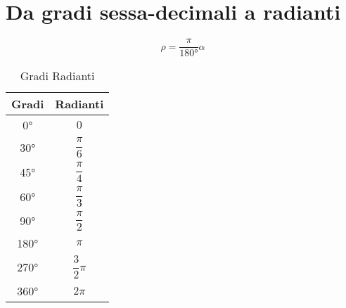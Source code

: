 \section{Da gradi sessa-decimali a radianti}
\begin{equation*}
\rho=\dfrac{\pi}{\ang{180}}\alpha
\end{equation*}
\begin{table}
	\centering
		\begin{tabular}{cc}
		\toprule 
		Gradi	&Radianti \\ 
		\midrule
		\ang{0}	&$0$  \\ 
		\ang{30}	&$\dfrac{\pi}{6}$  \\[0.3cm] 
		\ang{45}	&$\dfrac{\pi}{4}$  \\[0.3cm]  
		\ang{60}	&$\dfrac{\pi}{3}$  \\[0.3cm]  
		\ang{90}	&$\dfrac{\pi}{2}$  \\[0.3cm]  
		\ang{180}	&$\pi$  \\[0.3cm]  
		\ang{270}	&$\dfrac{3}{2}\pi$  \\[0.3cm]  
		\ang{360}	&$2\pi$  \\[0.3cm]  
		\bottomrule
	\end{tabular}
	\caption{Gradi Radianti}
\end{table}
\newpage

